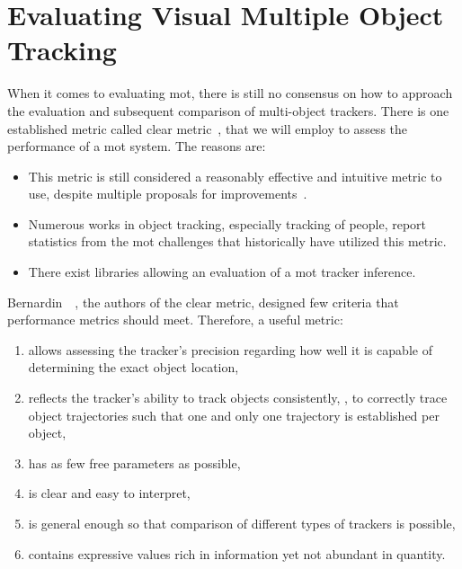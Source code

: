 \section{Evaluating Visual Multiple Object Tracking}
\label{sec:EvaluatingMOT}

When it comes to evaluating \gls{mot}, there is still no consensus on how to approach the evaluation and subsequent comparison of multi-object trackers. There is one established metric called \gls{clear} metric~\cite{bernardin2008clearmot}, that we will employ to assess the performance of a \gls{mot} system. The reasons are:
\begin{itemize}
    \item This metric is still considered a reasonably effective and intuitive metric to use, despite multiple proposals for improvements~\cite{wen2020uadetrac}.
    \item Numerous works in object tracking, especially tracking of people, report statistics from the \gls{mot} challenges that historically have utilized this metric.
    \item There exist libraries allowing an evaluation of a \gls{mot} tracker inference.
\end{itemize}

Bernardin~\etal{}~\cite{bernardin2008clearmot}, the authors of the \gls{clear} metric, designed few criteria that performance metrics should meet. Therefore, a useful metric:
\begin{enumerate}
    \item allows assessing the tracker's precision regarding how well it is capable of determining the exact object location,
    \item reflects the tracker's ability to track objects consistently, \ietext{}, to correctly trace object trajectories such that one and only one trajectory is established per object,
    \item has as few free parameters as possible,
    \item is clear and easy to interpret,
    \item is general enough so that comparison of different types of trackers is possible,
    \item contains expressive values rich in information yet not abundant in quantity.
\end{enumerate}

